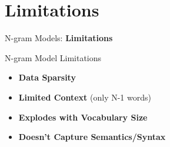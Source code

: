 \section{Limitations}
\begin{frame}{}
    \LARGE N-gram Models: \textbf{Limitations}
\end{frame}

\begin{frame}{N-gram Model Limitations}
    \begin{itemize}
        \item[\textwarning] \textbf{Data Sparsity}
        \item[\textwarning] \textbf{Limited Context} (only N-1 words)
        \item[\textwarning] \textbf{Explodes with Vocabulary Size}
        \item[\textwarning] \textbf{Doesn't Capture Semantics/Syntax}
    \end{itemize}
\end{frame}

